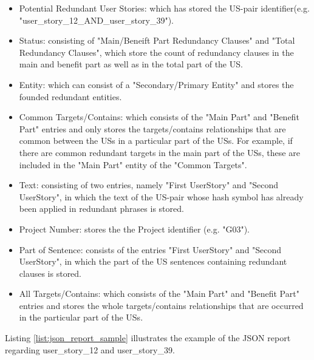 \begin{itemize}
	\item Potential Redundant User Stories:  which has stored the US-pair identifier(e.g. "user\_story\_12\_AND\_user\_story\_39"). 
	
	\item Status: consisting of "Main/Beneift Part Redundancy Clauses" and "Total Redundancy Clauses", which store the count of redundancy clauses in the main and benefit part as well as in the total part of the US.
	
	\item Entity: which can consist of a "Secondary/Primary Entity" and stores the founded redundant entities.
	
	\item Common Targets/Contains: which consists of the "Main Part" and "Benefit Part" entries and only stores the targets/contains relationships that are common between the USs in a particular part of the USs. For example, if there are common redundant targets in the main part of the USs, these are included in the "Main Part" entity of the "Common Targets".
	
	\item Text: consisting of two entries, namely "First UserStory" and "Second UserStory", in which the text of the US-pair whose hash symbol has already been applied in redundant phrases is stored.
	
	\item Project Number: stores the the Project identifier (e.g. "G03").
	
	\item Part of Sentence: consists of the entries "First UserStory" and "Second UserStory", in which the part of the US sentences containing redundant clauses is stored.
	
	\item All Targets/Contains: which consists of the "Main Part" and "Benefit Part" entries and stores the whole targets/contains relationships that are occurred in the particular part of the USs.
	
\end{itemize}
\begin{example}
	Listing \ref{list:json_report_sample} illustrates the example of the JSON report regarding user\_story\_12 and user\_story\_39.
\end{example}

